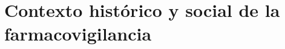 \section{Contexto histórico y social de la farmacovigilancia}\label{section:contextoHistoricoSocial}







